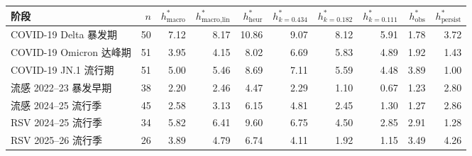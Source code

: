 \begin{tabular}{@{}lrrrrrrrrr@{}}
\toprule
阶段 & $n$ & $h^*_{\text{macro}}$ & $h^*_{\text{macro,lin}}$ & $h^*_{\text{heur}}$ & $h^*_{k=0.434}$ & $h^*_{k=0.182}$ & $h^*_{k=0.111}$ & $h^*_{\text{obs}}$ & $h^*_{\text{persist}}$ \\
\midrule
COVID-19 Delta 暴发期 & 50 & 7.12 & 8.17 & 10.86 & 9.07 & 8.12 & 5.91 & 1.78 & 3.72 \\
COVID-19 Omicron 达峰期 & 51 & 3.95 & 4.15 & 8.02 & 6.69 & 5.83 & 4.89 & 1.92 & 1.43 \\
COVID-19 JN.1 流行期 & 51 & 5.00 & 5.46 & 8.69 & 7.11 & 5.59 & 4.48 & 3.89 & 1.00 \\
流感 2022--23 暴发早期 & 38 & 2.20 & 2.46 & 4.47 & 2.29 & 1.10 & 0.67 & 1.23 & 2.80 \\
流感 2024--25 流行季 & 45 & 2.58 & 3.13 & 6.15 & 4.81 & 2.45 & 1.30 & 1.27 & 2.86 \\
RSV 2024--25 流行季 & 34 & 5.82 & 6.41 & 9.60 & 6.75 & 4.50 & 2.85 & 2.91 & 1.28 \\
RSV 2025--26 流行季 & 26 & 3.89 & 4.79 & 6.74 & 4.11 & 1.92 & 1.15 & 3.49 & 4.26 \\
\bottomrule
\end{tabular}
